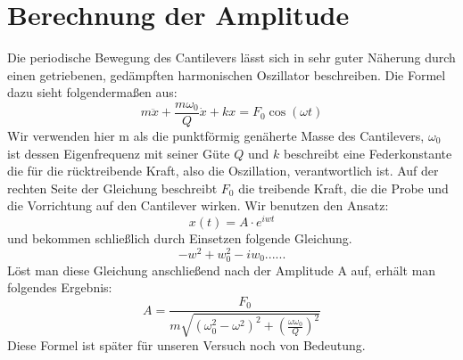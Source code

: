  
\section{Berechnung der Amplitude}
\label{herleitung}
 
Die periodische Bewegung des Cantilevers lässt sich in sehr guter Näherung durch einen getriebenen, gedämpften harmonischen Oszillator beschreiben. Die Formel dazu sieht folgendermaßen aus:
\[
    m \ddot{x} + \frac{m \omega_0}{Q} \dot{x} + kx = F_0 \cos(\omega t)
\]
Wir verwenden hier m als die punktförmig genäherte Masse des Cantilevers, $\omega_0$ ist dessen Eigenfrequenz mit seiner Güte $Q$ und $k$ beschreibt eine Federkonstante die für die rücktreibende Kraft, also die Oszillation, verantwortlich ist.
Auf der rechten Seite der Gleichung beschreibt $F_0$ die treibende Kraft, die die Probe und die Vorrichtung auf den Cantilever wirken.
Wir benutzen den Ansatz:
\[
    x(t)=A \cdot e^{iwt}
\]
und bekommen schließlich durch Einsetzen folgende Gleichung.
\[
    -w^2+w_0^2-iw_0......
\]
Löst man diese Gleichung anschließend nach der Amplitude A auf, erhält man folgendes Ergebnis:
\[
    A = \frac{F_0}{m \sqrt{ ( \omega_0^2 - \omega^2 )^2 + \left( \frac{\omega 
        \omega_0}{Q} \right)^2}}
\]
Diese Formel ist später für unseren Versuch noch von Bedeutung.
